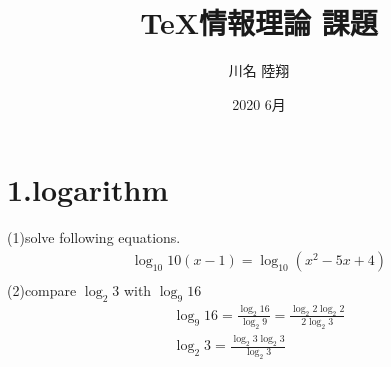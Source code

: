 \documentclass[14pt]{jsarticle}
\begin{document}
\title{{\TeX}情報理論 課題}
\author{川名 陸翔}
\date{2020 6月}

\section{1.logarithm}
\begin{flushleft}
(1)solve following equations.\\
\begin{align}
    \log_{10}{10(x-1)} = \log_{10}{(x^2 -5x + 4)}\\
\end{align}
(2)compare $\log_{2}{3}$ with $\log_{9}{16}$\\
\begin{align}
    \log_{9}{16} = \frac{\log_{2}{16}}{\log_{2}{9}} = \frac{\log_{2}{2}\log_{2}{2}}{2\log_{2}{3}} \\
    \log_{2}{3} = \frac{\log_{2}{3}\log_{2}{3}}{\log_{2}{3}}\\
\end{align}

    
\end{flushleft}
\end{document}
